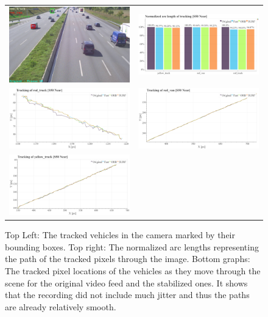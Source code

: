 \begin{figure}[!ht]
  \centering
  \begin{tabular}{cc}
    \includegraphics[width=0.45\linewidth]{diagrams/object_tracking/s50_s_near/frame.png}    &  
    \includegraphics[width=0.475\linewidth]{diagrams/object_tracking/s50_s_near/normalized_arc_lengths.html.png}    \\

    \includegraphics[width=0.475\linewidth]{diagrams/object_tracking/s50_s_near/red_truck.png}    &  
    \includegraphics[width=0.475\linewidth]{diagrams/object_tracking/s50_s_near/red_van.png}    \\  
    \includegraphics[width=0.475\linewidth]{diagrams/object_tracking/s50_s_near/yellow_truck.png}   
  \end{tabular}
  \caption{Top Left:
  The tracked vehicles in the camera  marked by their bounding boxes. 
  Top right: 
  The normalized arc lengths representing the path of the tracked pixels through the image.
  Bottom graphs:
  The tracked pixel locations of the vehicles as they move through the scene for the original video feed and the stabilized ones.
  It shows that the recording did not include much jitter and thus the paths are already relatively smooth.
  }
  \label{fig:object_tracking_appendix_s50_s_near}
\end{figure}

